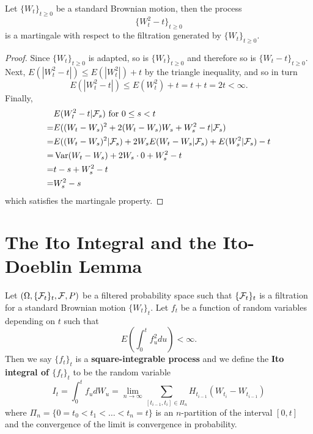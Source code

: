 \documentclass[11pt,fleqn]{book} %
\begin{document}
\begin{proposition} \label{prop:3219}
Let \(\{W_t\}_{t\geq0}\) be a standard Brownian motion, then the process
\[
\{W_t^2 - t\}_{t\geq0}
\]
is a martingale with respect to the filtration generated by \(\{W_t\}_{t\geq0}\).
\end{proposition}
\begin{proof} Since \(\{W_t\}_{t\geq0}\) is adapted, so is \(\{W_t\}_{t\geq0}\) and therefore so is \(\{W_t - t\}_{t\geq0}\). \\
\indent Next, \(E(|W_t^2 - t|) \leq E(|W_t^2|) + t\) by the triangle inequality, and so in turn
\[
E(|W_t^2 - t|) \leq E(W_t^2) + t = t + t = 2t < \infty.
\]
\indent Finally,
\[
\begin{aligned}
&E(W_t^2 - t|\mathcal{F}_s) \text{ for } 0 \leq s < t \\
= &E((W_t - W_s)^2 + 2(W_t - W_s)W_s + W_s^2 - t | \mathcal{F}_s) \\
= &E((W_t - W_s)^2|\mathcal{F}_s) + 2W_sE(W_t - W_s|\mathcal{F}_s) + E(W_s^2|\mathcal{F}_s) - t \\
= &\operatorname{Var}(W_t - W_s) + 2W_s \cdot 0 + W_s^2 - t \\
= &t - s + W_s^2 - t \\
= &W_s^2 - s
\end{aligned}
\]
which satisfies the martingale property.
\end{proof}


\section{The Ito Integral and the Ito-Doeblin Lemma}

\begin{definition} \label{def:331}
Let \((\Omega, \{\mathcal{F}_t\}_t, \mathcal{F}, P)\) be a filtered probability space such that \(\{\mathcal{F}_t\}_t\) is a filtration for a standard Brownian motion \(\{W_t\}_t\). Let \(f_t\) be a function of random variables depending on \(t\) such that
\[
E\left(\int_0^t f_u^2 du\right) < \infty.
\]
\indent Then we say \(\{f_t\}_t\) is a \textbf{square-integrable process} and we define the \textbf{Ito integral of \(\{f_t\}_t\)} to be the random variable
\[
I_t = \int_0^t f_udW_u = \lim_{n\rightarrow\infty}\sum_{[t_{i-1}, t_i] \in \Pi_n} H_{t_{i-1}}(W_{t_i} - W_{t_{i-1}})
\]
where \(\Pi_n  = \{0 = t_0 < t_1 < \dots < t_n = t\}\) is an \(n\)-partition of the interval \([0, t]\) and the convergence of the limit is convergence in probability.
\end{definition}
\end{document}
